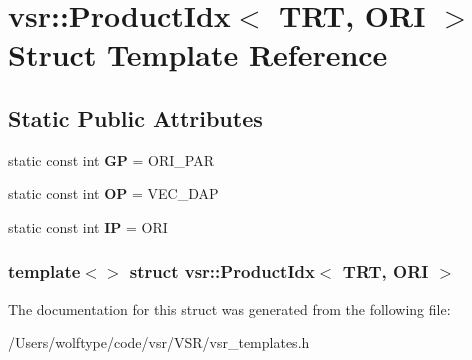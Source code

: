 \hypertarget{structvsr_1_1_product_idx_3_01_t_r_t_00_01_o_r_i_01_4}{\section{vsr\-:\-:Product\-Idx$<$ T\-R\-T, O\-R\-I $>$ Struct Template Reference}
\label{structvsr_1_1_product_idx_3_01_t_r_t_00_01_o_r_i_01_4}
}
\subsection*{Static Public Attributes}
\begin{DoxyCompactItemize}
\item 
\hypertarget{structvsr_1_1_product_idx_3_01_t_r_t_00_01_o_r_i_01_4_a96d1f7123fdcd18dc64db41a1821211d}{static const int {\bfseries G\-P} = O\-R\-I\-\_\-\-P\-A\-R}\label{structvsr_1_1_product_idx_3_01_t_r_t_00_01_o_r_i_01_4_a96d1f7123fdcd18dc64db41a1821211d}

\item 
\hypertarget{structvsr_1_1_product_idx_3_01_t_r_t_00_01_o_r_i_01_4_a059bee1315e1059681a192455f42440b}{static const int {\bfseries O\-P} = V\-E\-C\-\_\-\-D\-A\-P}\label{structvsr_1_1_product_idx_3_01_t_r_t_00_01_o_r_i_01_4_a059bee1315e1059681a192455f42440b}

\item 
\hypertarget{structvsr_1_1_product_idx_3_01_t_r_t_00_01_o_r_i_01_4_a90f2fdf9516636c7d31eb63a413d3ede}{static const int {\bfseries I\-P} = O\-R\-I}\label{structvsr_1_1_product_idx_3_01_t_r_t_00_01_o_r_i_01_4_a90f2fdf9516636c7d31eb63a413d3ede}

\end{DoxyCompactItemize}
\subsubsection*{template$<$$>$ struct vsr\-::\-Product\-Idx$<$ T\-R\-T, O\-R\-I $>$}



The documentation for this struct was generated from the following file\-:\begin{DoxyCompactItemize}
\item 
/\-Users/wolftype/code/vsr/\-V\-S\-R/vsr\-\_\-templates.\-h\end{DoxyCompactItemize}
